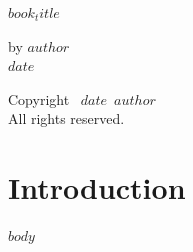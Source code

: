 \documentclass[12pt]{memoir}
\def\booktitle{$book_title$}
\def\bookauthor{$author$}
\def\bookdate{$date$}
\begin{document}
\thispagestyle{empty}
\begin{center}
\vspace*{1in}
{\Huge\bfseries\booktitle\par}
\vfill
{\Large by \bookauthor}\\
\vfill
{\large\bookdate}
\end{center}

\clearpage
\thispagestyle{empty}
\vspace*{\fill}
\begin{center}
Copyright \textcopyright\ \bookdate\ \bookauthor\\
All rights reserved.
\end{center}
\vspace*{\fill}

\clearpage
\tableofcontents

\chapter{Introduction}

$body$
\end{document}
